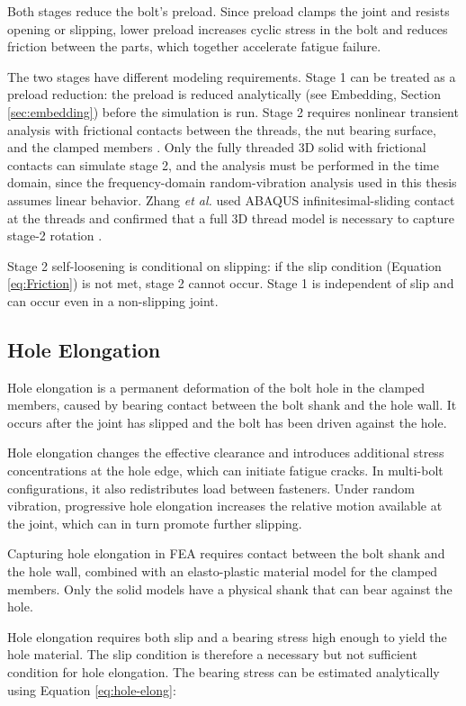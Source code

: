 \documentclass[a4paper,twoside]{bth}
\begin{document}
Both stages reduce the bolt's preload. Since preload clamps the joint and resists opening or slipping, lower preload increases cyclic stress in the bolt and reduces friction between the parts, which together accelerate fatigue failure.

The two stages have different modeling requirements. Stage 1 can be treated as a preload reduction: the preload is reduced analytically (see Embedding, Section \ref{sec:embedding}) before the simulation is run. Stage 2 requires nonlinear transient analysis with frictional contacts between the threads, the nut bearing surface, and the clamped members \cite{siemens_bolt_analysis_2026}. Only the fully threaded 3D solid with frictional contacts can simulate stage 2, and the analysis must be performed in the time domain, since the frequency-domain random-vibration analysis used in this thesis assumes linear behavior. Zhang \textit{et al.} used ABAQUS infinitesimal-sliding contact at the threads and confirmed that a full 3D thread model is necessary to capture stage-2 rotation \cite{52}.

Stage 2 self-loosening is conditional on slipping: if the slip condition (Equation \ref{eq:Friction}) is not met, stage 2 cannot occur. Stage 1 is independent of slip and can occur even in a non-slipping joint.

\subsection{Hole Elongation}
Hole elongation is a permanent deformation of the bolt hole in the clamped members, caused by bearing contact between the bolt shank and the hole wall. It occurs after the joint has slipped and the bolt has been driven against the hole.

Hole elongation changes the effective clearance and introduces additional stress concentrations at the hole edge, which can initiate fatigue cracks. In multi-bolt configurations, it also redistributes load between fasteners. Under random vibration, progressive hole elongation increases the relative motion available at the joint, which can in turn promote further slipping.

Capturing hole elongation in \ac{FEA} requires contact between the bolt shank and the hole wall, combined with an elasto-plastic material model for the clamped members. Only the solid models have a physical shank that can bear against the hole. 

Hole elongation requires both slip and a bearing stress high enough to yield the hole material. The slip condition is therefore a necessary but not sufficient condition for hole elongation. The bearing stress can be estimated analytically using Equation \ref{eq:hole-elong}:
\end{document}
